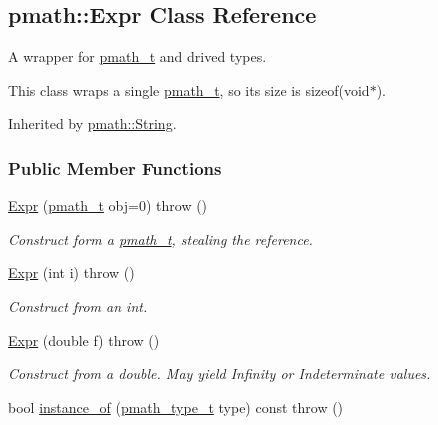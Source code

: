 \hypertarget{classpmath_1_1_expr}{
\subsection{pmath::Expr Class Reference}
\label{classpmath_1_1_expr}
}
A wrapper for \hyperlink{classpmath__t}{pmath\_\-t} and drived types.

This class wraps a single \hyperlink{classpmath__t}{pmath\_\-t}, so its size is sizeof(void$\ast$).  


Inherited by \hyperlink{classpmath_1_1_string}{pmath::String}.

\subsubsection*{Public Member Functions}
\begin{CompactItemize}
\item 
\hypertarget{classpmath_1_1_expr_d94402d41c5577a24eb8775d01f70dce}{
\hyperlink{classpmath_1_1_expr_d94402d41c5577a24eb8775d01f70dce}{Expr} (\hyperlink{classpmath__t}{pmath\_\-t} obj=0)  throw ()}
\label{classpmath_1_1_expr_d94402d41c5577a24eb8775d01f70dce}

\begin{CompactList}\small\item\em Construct form a \hyperlink{classpmath__t}{pmath\_\-t}, stealing the reference. \item\end{CompactList}\item 
\hypertarget{classpmath_1_1_expr_b50be52de56188da3fcbedce42804570}{
\hyperlink{classpmath_1_1_expr_b50be52de56188da3fcbedce42804570}{Expr} (int i)  throw ()}
\label{classpmath_1_1_expr_b50be52de56188da3fcbedce42804570}

\begin{CompactList}\small\item\em Construct from an int. \item\end{CompactList}\item 
\hypertarget{classpmath_1_1_expr_c1940d712bf288f88cd15ad14010821c}{
\hyperlink{classpmath_1_1_expr_c1940d712bf288f88cd15ad14010821c}{Expr} (double f)  throw ()}
\label{classpmath_1_1_expr_c1940d712bf288f88cd15ad14010821c}

\begin{CompactList}\small\item\em Construct from a double. May yield Infinity or Indeterminate values. \item\end{CompactList}\item 
\hypertarget{classpmath_1_1_expr_3475bb9133af2108b98b06ea021abccb}{
bool \hyperlink{classpmath_1_1_expr_3475bb9133af2108b98b06ea021abccb}{instance\_\-of} (\hyperlink{group__objects_ge2646df76dcb0113715322b13a1f36f0}{pmath\_\-type\_\-t} type) const   throw ()}
\label{classpmath_1_1_expr_3475bb9133af2108b98b06ea021abccb}


\end{CompactItemize}
